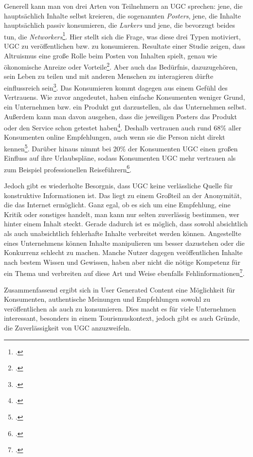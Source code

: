 Generell kann man von drei Arten von Teilnehmern an UGC sprechen: jene, die hauptsächlich Inhalte selbst kreieren, die sogenannten \textit{Posters}, jene, die Inhalte hauptsächlich passiv konsumieren, die \textit{Lurkers} und jene, die bevorzugt beides tun, die \textit{Networkers}\footcite{morrison}. Hier stellt sich die Frage, was diese drei Typen motiviert, UGC zu veröffentlichen bzw. zu konsumieren. Resultate einer Studie zeigen, dass Altruismus eine große Rolle beim Posten von Inhalten spielt, genau wie ökonomische Anreize oder Vorteile\footcite{poch}. Aber auch das Bedürfnis, dazuzugehören, sein Leben zu teilen und mit anderen Menschen zu interagieren dürfte einflussreich sein\footcite{akehurst}. Das Konsumieren kommt dagegen aus einem Gefühl des Vertrauens. Wie zuvor angedeutet, haben einfache Konsumenten weniger Grund, ein Unternehmen bzw. ein Produkt gut darzustellen, als das Unternehmen selbst. Außerdem kann man davon ausgehen, dass die jeweiligen Posters das Produkt oder den Service schon getestet haben\footcite{akehurst}. Deshalb vertrauen auch rund 68\% aller Konsumenten online Empfehlungen, auch wenn sie die Person nicht direkt kennen\footcite{ramirez}. Darüber hinaus nimmt bei 20\% der Konsumenten UGC einen großen Einfluss auf ihre Urlaubspläne, sodass Konsumenten UGC mehr vertrauen als zum Beispiel professionellen Reiseführern\footcite{akehurst}.

Jedoch gibt es wiederholte Besorgnis, dass UGC keine verlässliche Quelle für konstruktive Informationen ist. Das liegt zu einem Großteil an der Anonymität, die das Internet ermöglicht. Ganz egal, ob es sich um eine Empfehlung, eine Kritik oder sonstiges handelt, man kann nur selten zuverlässig bestimmen, wer hinter einem Inhalt steckt. Gerade dadurch ist es möglich, dass sowohl absichtlich als auch unabsichtlich fehlerhafte Inhalte verbreitet werden können. Angestellte eines Unternehmens können Inhalte manipulieren um besser dazustehen oder die Konkurrenz schlecht zu machen. Manche Nutzer dagegen veröffentlichen Inhalte nach bestem Wissen und Gewissen, haben aber nicht die nötige Kompetenz für ein Thema und verbreiten auf diese Art und Weise ebenfalls Fehlinformationen\footcite{chen}.

Zusammenfassend ergibt sich in User Generated Content eine Möglichkeit für Konsumenten, authentische Meinungen und Empfehlungen sowohl zu veröffentlichen als auch zu konsumieren. Dies macht es für viele Unternehmen interessant, besonders in einem Tourismuskontext, jedoch gibt es auch Gründe, die Zuverlässigkeit von UGC anzuzweifeln.

